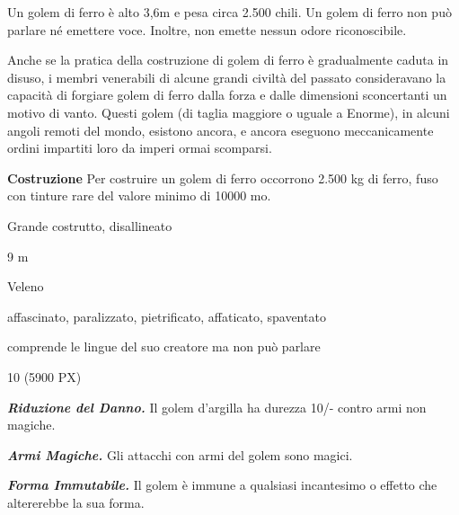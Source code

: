 \begin{multicols}{2}
{Un golem di ferro è alto 3,6m e pesa circa 2.500 chili. Un golem di ferro non può parlare né emettere voce. Inoltre, non emette nessun odore riconoscibile.

Anche se la pratica della costruzione di golem di ferro è gradualmente caduta in disuso, i membri venerabili di alcune grandi civiltà del passato consideravano la capacità di forgiare golem di ferro dalla forza e dalle dimensioni sconcertanti un motivo di vanto. Questi golem (di taglia maggiore o uguale a Enorme), in alcuni angoli remoti del mondo, esistono ancora, e ancora eseguono meccanicamente ordini impartiti loro da imperi ormai scomparsi.

\textbf{Costruzione}
Per costruire un golem di ferro occorrono 2.500 kg di ferro, fuso con tinture rare del valore minimo di 10000 mo.

\begin{description}[noitemsep, topsep=0pt, parsep=0pt, partopsep=0pt, itemsep=1pt, leftmargin=2.35cm,  labelwidth=2.2cm, itemindent=0cm, listparindent=0pt] %
\setlength{\baselineskip}{10pt}
\item[\textbf{Taglia/Tipo}] Grande costrutto, disallineato
\item[\textbf{Caratt.}] 
\item[\textbf{Punti Ferita}] 
\item[\textbf{Movimento}] 9 m
\item[\textbf{Tiri Salvez.}] 
\item[\textbf{Imm. Danni}] Veleno
\item[\textbf{Immunità}] affascinato, paralizzato, pietrificato, affaticato, spaventato
\item[\textbf{Sensi}] 
\item[\textbf{Linguaggi}] comprende le lingue del suo creatore ma non può parlare
\item[\textbf{Sfida}] 10 (5900 PX)
\end{description}
\smallskip

\emph{\textbf{Riduzione del Danno.}} Il golem d'argilla ha durezza 10/- contro armi non magiche.

\emph{\textbf{Armi Magiche.}} Gli attacchi con armi del golem sono magici.

\emph{\textbf{Forma Immutabile.}} Il golem è immune a qualsiasi incantesimo o effetto che altererebbe la sua forma.

}
\end{multicols}

